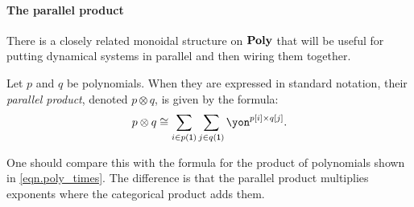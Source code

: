 \documentclass[Book-Poly]{subfiles}
\begin{document}
\paragraph{The parallel product}
There is a closely related monoidal structure on $\mathbf{Poly}$ that will be useful for putting dynamical systems in parallel and then wiring them together.

\begin{definition}\label{def.dirichlet}
Let $p$ and $q$ be polynomials. When they are expressed in standard notation, their \emph{parallel product}, denoted $p\otimes q$, is given by the formula:
\begin{equation}\label{eqn.parallel_def}
p\otimes q\cong\sum_{i\in p(\1)}\sum_{j\in q(\1)}\yon^{p[i]\times q[j]}.
\end{equation}
\end{definition}

One should compare this with the formula for the product of polynomials shown in \eqref{eqn.poly_times}. The difference is that the parallel product multiplies exponents where the categorical product adds them.

\end{document}
